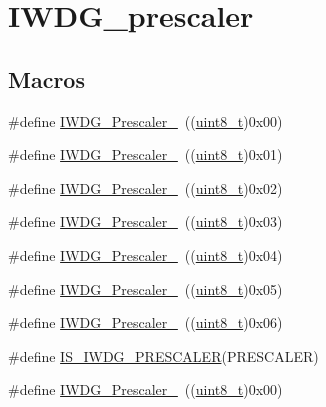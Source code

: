 \hypertarget{group___i_w_d_g__prescaler}{}\section{I\+W\+D\+G\+\_\+prescaler}
\label{group___i_w_d_g__prescaler}
\subsection*{Macros}
\begin{DoxyCompactItemize}
\item 
\#define \hyperlink{group___i_w_d_g__prescaler_ga82a058c196d5a9cd7ea2f2202b394ba0}{I\+W\+D\+G\+\_\+\+Prescaler\+\_}~((\hyperlink{_p_e___types_8h_aba7bc1797add20fe3efdf37ced1182c5}{uint8\+\_\+t})0x00)
\item 
\#define \hyperlink{group___i_w_d_g__prescaler_ga59763b9a127c67adf5d11474188996a1}{I\+W\+D\+G\+\_\+\+Prescaler\+\_}~((\hyperlink{_p_e___types_8h_aba7bc1797add20fe3efdf37ced1182c5}{uint8\+\_\+t})0x01)
\item 
\#define \hyperlink{group___i_w_d_g__prescaler_gafa81d30511ff5ec74bb38ed71f5bb66e}{I\+W\+D\+G\+\_\+\+Prescaler\+\_}~((\hyperlink{_p_e___types_8h_aba7bc1797add20fe3efdf37ced1182c5}{uint8\+\_\+t})0x02)
\item 
\#define \hyperlink{group___i_w_d_g__prescaler_gaa8b091b6e4102513b1e3a1c4eb6756ba}{I\+W\+D\+G\+\_\+\+Prescaler\+\_}~((\hyperlink{_p_e___types_8h_aba7bc1797add20fe3efdf37ced1182c5}{uint8\+\_\+t})0x03)
\item 
\#define \hyperlink{group___i_w_d_g__prescaler_ga7ea813c73ae0acb40acb60e7d3956910}{I\+W\+D\+G\+\_\+\+Prescaler\+\_}~((\hyperlink{_p_e___types_8h_aba7bc1797add20fe3efdf37ced1182c5}{uint8\+\_\+t})0x04)
\item 
\#define \hyperlink{group___i_w_d_g__prescaler_gaea6bf96c2fd5a6f3b9574e7898096641}{I\+W\+D\+G\+\_\+\+Prescaler\+\_}~((\hyperlink{_p_e___types_8h_aba7bc1797add20fe3efdf37ced1182c5}{uint8\+\_\+t})0x05)
\item 
\#define \hyperlink{group___i_w_d_g__prescaler_ga7d6e918748185639049644c970db2b43}{I\+W\+D\+G\+\_\+\+Prescaler\+\_}~((\hyperlink{_p_e___types_8h_aba7bc1797add20fe3efdf37ced1182c5}{uint8\+\_\+t})0x06)
\item 
\#define \hyperlink{group___i_w_d_g__prescaler_gab1e0695c1a22840d5be7c7fad283f4ba}{I\+S\+\_\+\+I\+W\+D\+G\+\_\+\+P\+R\+E\+S\+C\+A\+L\+ER}(P\+R\+E\+S\+C\+A\+L\+ER)
\item 
\#define \hyperlink{group___i_w_d_g__prescaler_ga82a058c196d5a9cd7ea2f2202b394ba0}{I\+W\+D\+G\+\_\+\+Prescaler\+\_}~((\hyperlink{_p_e___types_8h_aba7bc1797add20fe3efdf37ced1182c5}{uint8\+\_\+t})0x00)

\end{DoxyCompactItemize}
